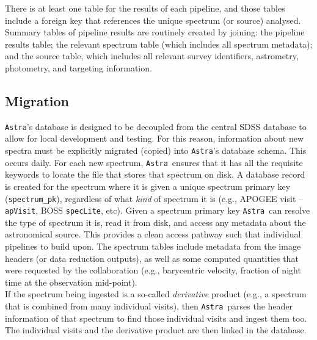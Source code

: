 \documentclass[modern]{aastex631}
\newcommand{\astra}{\texttt{Astra}}
\newcommand{\Astra}{\astra}
\begin{document}
There is at least one table for the results of each pipeline, and those tables include a foreign key that references the unique spectrum (or source) analysed. Summary tables of pipeline results are routinely created by joining: the pipeline results table; the relevant spectrum table (which includes all spectrum metadata); and the source table, which includes all relevant survey identifiers, astrometry, photometry, and targeting information.


\subsection{Migration}

\Astra's database is designed to be decoupled from the central SDSS database to allow for local development and testing.
For this reason, information about new spectra must be explicitly migrated (copied) into \Astra's database schema.
This occurs daily. For each new spectrum, \Astra\ ensures that it has all the requisite keywords to locate the file that stores that spectrum on disk. A database record is created for the spectrum where it is given a unique spectrum primary key (\texttt{spectrum\_pk}), regardless of what \emph{kind} of spectrum it is (e.g., APOGEE visit -- \texttt{apVisit}, BOSS \texttt{specLite}, etc). Given a spectrum primary key \Astra\ can resolve the type of spectrum it is, read it from disk, and access any metadata about the astronomical source. This provides a clean access pathway such that individual pipelines to build upon. The spectrum tables include  metadata from the image headers (or data reduction outputs), as well as some computed quantities that were requested by the collaboration (e.g., barycentric velocity, fraction of night time at the observation mid-point).\\

If the spectrum being ingested is a so-called \emph{derivative} product (e.g., a spectrum that is combined from many individual visits), then \Astra\ parses the header information of that spectrum to find those individual visits and ingest them too. The individual visits and the derivative product are then linked in the database.
\end{document}
